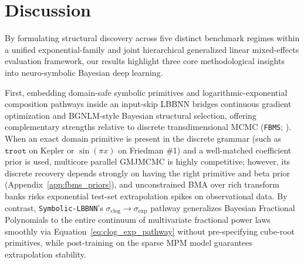 \documentclass[11pt,a4paper]{article}
\begin{document}
\section{Discussion}
\label{sec:discussion}

By formulating structural discovery across five distinct benchmark regimes within a unified exponential-family and joint hierarchical generalized linear mixed-effects evaluation framework, our results highlight three core methodological insights into neuro-symbolic Bayesian deep learning.

First, embedding domain-safe symbolic primitives and logarithmic-exponential composition pathways inside an input-skip LBBNN bridges continuous gradient optimization and BGNLM-style Bayesian structural selection, offering complementary strengths relative to discrete transdimensional MCMC (\texttt{FBMS}; \citealp{hubin2021bgnlm, frommlet2025fbms}). When an exact domain primitive is present in the discrete grammar (such as $\texttt{troot}$ on Kepler or $\sin(\pi x)$ on Friedman \#1) and a well-matched coefficient prior is used, multicore parallel GMJMCMC is highly competitive; however, its discrete recovery depends strongly on having the right primitive and beta prior (Appendix~\ref{app:fbms_priors}), and unconstrained BMA over rich transform banks risks exponential test-set extrapolation spikes on observational data. By contrast, \texttt{Symbolic-LBBNN}'s $\sigma_{\text{clog}} \to \sigma_{\exp}$ pathway generalizes Bayesian Fractional Polynomials \citep{hubin2023fractional} to the entire continuum of multivariate fractional power laws smoothly via Equation~\eqref{eq:clog_exp_pathway} without pre-specifying cube-root primitives, while post-training on the sparse MPM model guarantees extrapolation stability.
\end{document}
